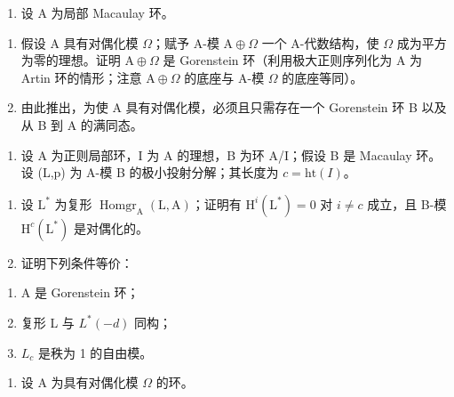 
\begin{enumerate}
\def\labelenumi{\arabic{enumi})}
\tightlist
\item
  设 A 为局部 Macaulay 环。
\end{enumerate}

\begin{enumerate}
\def\labelenumi{\alph{enumi})}
\item
  假设 A 具有对偶化模 \(\Omega\)；赋予 A-模 \(\mathrm{A} \oplus \Omega\) 一个 A-代数结构，使 \(\Omega\) 成为平方为零的理想。证明 \(\mathrm{A} \oplus \Omega\) 是 Gorenstein 环（利用极大正则序列化为 A 为 Artin 环的情形；注意 \(\mathrm{A} \oplus \Omega\) 的底座与 A-模 \(\Omega\) 的底座等同）。
\item
  由此推出，为使 A 具有对偶化模，必须且只需存在一个 Gorenstein 环 B 以及从 B 到 A 的满同态。
\end{enumerate}

\begin{enumerate}
\def\labelenumi{\arabic{enumi})}
\setcounter{enumi}{1}
\tightlist
\item
  设 A 为正则局部环，I 为 A 的理想，B 为环 A/I；假设 B 是 Macaulay 环。设 (L,p) 为 A-模 B 的极小投射分解；其长度为 \(c = \text{ht}(I)\)。
\end{enumerate}

\begin{enumerate}
\def\labelenumi{\alph{enumi})}
\item
  设 \(\mathrm{L}^*\) 为复形 \(\operatorname{Homgr}_{\mathrm{A}}(\mathrm{L},\mathrm{A})\)；证明有 \(\mathrm{H}^{i}(\mathrm{L}^{*}) = 0\) 对 \(i\neq c\) 成立，且 B-模 \(\mathrm{H}^c (\mathrm{L}^*)\) 是对偶化的。
\item
  证明下列条件等价：
\end{enumerate}

\begin{enumerate}
\def\labelenumi{(\roman{enumi})}
\item
  A 是 Gorenstein 环；
\item
  复形 L 与 \(L^{*}(-d)\) 同构；
\item
  \(L_{c}\) 是秩为 1 的自由模。
\end{enumerate}

\begin{enumerate}
\def\labelenumi{\arabic{enumi})}
\setcounter{enumi}{2}
\tightlist
\item
  设 A 为具有对偶化模 \(\Omega\) 的环。
\end{enumerate}

